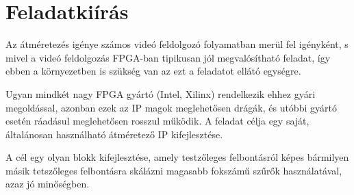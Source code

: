 \setcounter{page}{1}

\selecthungarian

\chapter*{Feladatkiírás}

Az átméretezés igénye számos videó feldolgozó folyamatban merül fel igényként, s mivel a videó feldolgozás FPGA-ban tipikusan jól  megvalósítható feladat, így ebben a környezetben is szükség van az ezt a feladatot ellátó egységre.

Ugyan mindkét nagy FPGA gyártó (Intel, Xilinx) rendelkezik ehhez gyári megoldással, azonban ezek az IP magok meglehetősen drágák, és utóbbi gyártó esetén ráadásul meglehetősen rosszul működik. A feladat célja egy saját, általánosan használható átméretező IP kifejlesztése.

A cél egy olyan blokk kifejlesztése, amely testzőleges felbontásról képes bármilyen másik tetszőleges felbontásra skálázni magasabb fokszámű szűrők használatával, azaz jó minőségben.



\vfill
\cleardoublepage

\selectthesislanguage

\setcounter{romanPage}{\value{page}}
